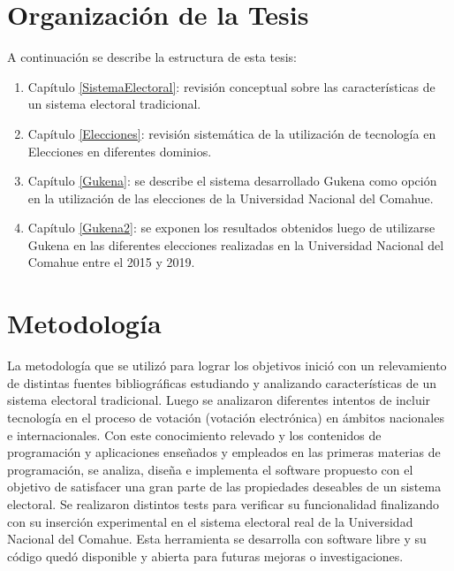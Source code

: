 \section{Organización de la Tesis}
A continuación se describe la estructura de esta tesis:
\begin{enumerate}
    \item Capítulo \ref{SistemaElectoral}: revisión conceptual sobre las características  
    de un sistema electoral tradicional.
    \item Capítulo \ref{Elecciones}: revisión sistemática de la utilización de tecnología en  Elecciones en diferentes dominios.
    \item Capítulo \ref{Gukena}: se describe el sistema desarrollado Gukena como opción en la utilización de las elecciones de la Universidad Nacional del Comahue.
    \item Capítulo \ref{Gukena2}: se exponen los resultados obtenidos luego de utilizarse Gukena en las diferentes elecciones realizadas en la Universidad Nacional del Comahue entre el 2015 y 2019.
\end{enumerate}

\section{Metodología}
La metodología que se utilizó para lograr los objetivos inició con un relevamiento de distintas fuentes bibliográficas estudiando y analizando características de un sistema electoral tradicional.
Luego se analizaron diferentes intentos de incluir tecnología en el proceso de votación (votación electrónica) en ámbitos nacionales e internacionales. Con este conocimiento relevado y los contenidos de programación y aplicaciones enseñados y empleados en las primeras materias de programación, se analiza, diseña e implementa el software propuesto con el objetivo de satisfacer una gran parte de las propiedades deseables de un sistema electoral. Se realizaron distintos tests para verificar su funcionalidad finalizando con su inserción experimental en el sistema electoral real de la Universidad Nacional del Comahue. Esta herramienta se desarrolla con software libre y su código quedó disponible y abierta para futuras mejoras o investigaciones.

